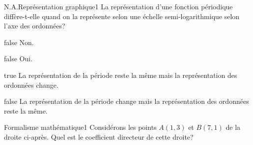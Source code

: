 		\begin{question}{N.A.}{Représentation graphique}{1}{}
            La représentation d'une fonction périodique diffère-t-elle quand on la représente selon une échelle semi-logarithmique selon l'axe des ordonnées?
        \end{question}
        \begin{reponses}
            \item[false] Non.
		    \item[false] Oui.
		    \item[true] La représentation de la période reste la même mais la représentation des ordonnées change.
		    \item[false] La représentation de la période change mais la représentation des ordonnées reste la même.
	    \end{reponses}
		\begin{question}{27}{Formalisme mathématique}{1}{}
            Considérons les points $A(1,3)$ et $B(7,1)$ de la droite ci-après. Quel est le coefficient directeur de cette droite?
            \begin{figure}
             \end{figure}
        \end{question}
